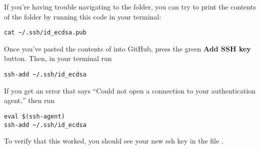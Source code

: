 \begin{enumerate}
    If you're having trouble navigating to the  folder, you can try to print the contents of the folder by running this code in your terminal:
\begin{lstlisting}
cat ~/.ssh/id_ecdsa.pub 
\end{lstlisting}
    Once you've pasted the contents of  into GitHub, press the green \textbf{Add SSH key} button.
    Then, in your terminal run 
\begin{lstlisting}
ssh-add ~/.ssh/id_ecdsa 
\end{lstlisting}
    If you get an error that says ``Could not open a connection to your authentication agent,'' then run 
\begin{lstlisting}
eval $(ssh-agent)
ssh-add ~/.ssh/id_ecdsa 
\end{lstlisting}

    To verify that this worked, you should see your new ssh key in the file .
  
  

\end{enumerate}
